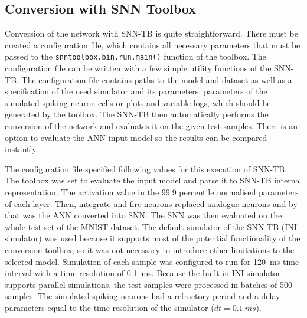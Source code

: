 \subsection{Conversion with SNN Toolbox}
Conversion of the network with SNN-TB is quite straightforward. There must be created a configuration file, which contains all necessary parameters that must be passed to the \texttt{snntoolbox.bin.run.main()} function of the toolbox. The configuration file can be written with a few simple utility functions of the SNN-TB. The configuration file contains paths to the model and dataset as well as a specification of the used simulator and its parameters, parameters of the simulated spiking neuron cells or plots and variable logs, which should be generated by the toolbox. The SNN-TB then automatically performs the conversion of the network and evaluates it on the given test samples. There is an option to evaluate the ANN input model so the results can be compared instantly. \par
The configuration file specified following values for this execution of SNN-TB: The toolbox was set to evaluate the input model and parse it to SNN-TB internal representation. The activation value in the 99.9 percentile normalised parameters of each layer. Then, integrate-and-fire neurons replaced analogue neurons and by that was the ANN converted into SNN. The SNN was then evaluated on the whole test set of the MNIST dataset. The default simulator of the SNN-TB (INI simulator) was used because it supports most of the potential functionality of the conversion toolbox, so it was not necessary to introduce other limitations to the selected model. Simulation of each sample was configured to run for 120~ms time interval with a time resolution of 0.1~ms. Because the built-in INI simulator supports parallel simulations, the test samples were processed in batches of 500 samples. The simulated spiking neurons had a refractory period and a delay parameters equal to the time resolution of the simulator ($dt=0.1~ms$).\par

